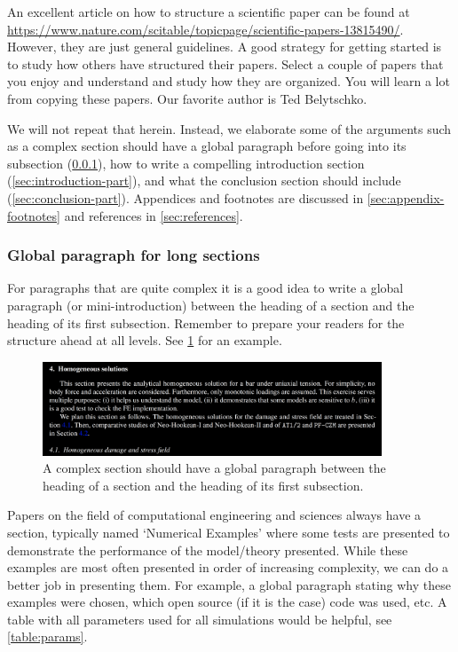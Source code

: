\documentclass[authoryear,3p,times,preprint,review,fleqn]{elsarticle}
\numberwithin{equation}{section}
\theoremstyle{remark}
\begin{document}
An excellent article on how to structure a scientific paper can be found at \url{https://www.nature.com/scitable/topicpage/scientific-papers-13815490/}. However, they are just general guidelines. A good strategy for getting started is to study how others have structured their papers. Select a couple of papers that you enjoy and understand and study how they are organized. You will learn a lot from copying these papers. Our favorite author is Ted Belytschko.

 We will not repeat that herein. Instead, we elaborate some of the arguments such as a complex section should have a global paragraph before going into its subsection (\cref{sec:global-para}), how to write a compelling introduction section (\cref{sec:introduction-part}), and 
what the conclusion section  should include (\cref{sec:conclusion-part}).  Appendices and footnotes are discussed in \cref{sec:appendix-footnotes} and references in \cref{sec:references}.

\subsubsection{Global paragraph for long sections}\label{sec:global-para}

For paragraphs that are quite complex it is a good idea to write a global paragraph (or mini-introduction) between the heading of a section and the heading of its first subsection. Remember to prepare your readers for the structure ahead at all levels. See \cref{fig:section} for an example. 


\begin{figure}[!h]
  \centering
  \includegraphics[width=0.9\textwidth]{section}
  \caption{A complex section should have a global paragraph between the heading of a section and the heading of its first subsection.}
  \label{fig:section}
\end{figure}


Papers on the field of computational engineering and sciences always have a section, typically named `Numerical Examples' where some tests are presented to demonstrate the performance of the model/theory presented. While these examples are most often presented in order of increasing complexity, we can do a better job in presenting them. For example, a global paragraph stating why these examples were chosen, which open source (if it is the case) code was used, etc. A table with all parameters used for all simulations would be helpful, see  \cref{table:params}.
\end{document}
